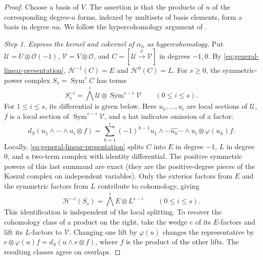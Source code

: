 \documentclass[12pt,reqno,a4paper]{amsart}
\numberwithin{equation}{section}
\numberwithin{figure}{section}
\theoremstyle{plain}
\theoremstyle{definition}
\begin{document}
\begin{proof}
Choose a basis of $V$. The assertion is that the products of $n$ of
the corresponding degree-$a$ forms, indexed by multisets of basis
elements, form a basis in degree $na$. We follow the hypercohomology
argument of \cite[Section~4.1]{RSWY}.

\smallskip
\noindent\textit{Step 1. Express the kernel and cokernel of $\alpha_n$ as hypercohomology.}
Put $\mathcal U=U\otimes\mathcal O(-1)$,
$\mathcal V=V\otimes\mathcal O$, and
$C=[\mathcal U\xrightarrow{\varphi}\mathcal V]$ in degrees $-1,0$.
By \eqref{eq:general-linear-presentation},
$\mathcal H^{-1}(C)=E$ and $\mathcal H^0(C)=L$.
For $s\geq0$, the symmetric-power complex $S_s=\operatorname{Sym}^sC$
has terms
\begin{equation}\label{eq:symmetric-power-complex}
 S_s^{-i}=\bigwedge^i\mathcal U\otimes
                    \operatorname{Sym}^{s-i}\mathcal V
       \qquad(0\leq i\leq s).
\end{equation}
For $1\leq i\leq s$, its differential is given below.
Here $u_1,\ldots,u_i$ are local sections of $\mathcal U$,
$f$ is a local section of $\operatorname{Sym}^{s-i}\mathcal V$,
and a hat indicates omission of a factor:
\[
 d_S(u_1\wedge\cdots\wedge u_i\otimes f)
 =\sum_{h=1}^i(-1)^{h-1}
   u_1\wedge\cdots\widehat{u_h}\cdots\wedge u_i
      \otimes\varphi(u_h)f.
\]
Locally, \eqref{eq:general-linear-presentation} splits $C$ into $E$
in degree $-1$, $L$ in degree $0$, and a two-term complex with
identity differential. The positive symmetric powers of this last
summand are exact (they are the positive-degree pieces of the Koszul
complex on independent variables). Only the exterior factors from
$E$ and the symmetric factors from $L$ contribute to cohomology, giving
\begin{equation}\label{eq:power-complex-cohomology}
 \mathcal H^{-i}(S_s)=\bigwedge^iE\otimes L^{s-i}
       \qquad(0\leq i\leq s).
\end{equation}
This identification is independent of the local splitting. To recover
the cohomology class of a product on the right, take the wedge $e$
of its $E$-factors and lift its $L$-factors to $\mathcal V$. Changing
one lift by $\varphi(u)$ changes the representative by
$e\otimes\varphi(u)f=d_S(u\wedge e\otimes f)$, where $f$ is the
product of the other lifts. The resulting classes agree on overlaps.


\end{proof}
\end{document}
